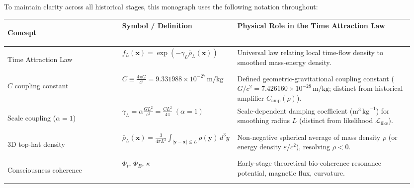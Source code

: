\documentclass[10pt,a4paper]{article}
\begin{document}
\vspace{1.5mm}
\par
To maintain clarity across all historical stages, this monograph uses the following notation throughout:
\begin{center}\vspace{-2pt}
{\footnotesize
\begin{tabular}{@{}>{\bfseries\raggedright\arraybackslash}p{0.28\linewidth}>{\raggedright\arraybackslash}p{0.24\linewidth}>{\raggedright\arraybackslash}p{0.43\linewidth}@{}}
\toprule
Concept & Symbol / Definition & Physical Role in the Time Attraction Law \\
\midrule
Time Attraction Law & $f_L(\mathbf{x}) = \exp(-\gamma_L \bar{\rho}_L(\mathbf{x}))$ & Universal law relating local time-flow density to smoothed mass-energy density. \\
$C$ coupling constant & $C \equiv \frac{4\pi G}{c^2} = 9.331988\times 10^{-27}\,\text{m/kg}$ & Defined geometric-gravitational coupling constant ($G/c^2 = 7.426160\times 10^{-28}\,\text{m/kg}$; distinct from historical amplifier $C_{\text{amp}}(\rho)$). \\
Scale coupling ($\alpha=1$) & $\gamma_L = \alpha\frac{G L^2}{c^2} = \frac{C L^2}{4\pi}\;(\alpha=1)$ & Scale-dependent damping coefficient ($\text{m}^3\,\text{kg}^{-1}$) for smoothing radius $L$ (distinct from likelihood $\mathcal{L}_{\text{like}}$). \\
3D top-hat density & $\bar{\rho}_L(\mathbf{x}) = \frac{3}{4\pi L^3}\int_{|\mathbf{y}-\mathbf{x}|\le L}\rho(\mathbf{y})\,d^3y$ & Non-negative spherical average of mass density $\rho$ (or energy density $\varepsilon/c^2$), resolving $\rho<0$. \\
Consciousness coherence & $\Phi_t,\,\Phi_B,\,\kappa$ & Early-stage theoretical bio-coherence resonance potential, magnetic flux, curvature. \\
\bottomrule
\end{tabular}}
\end{center}
\end{document}
